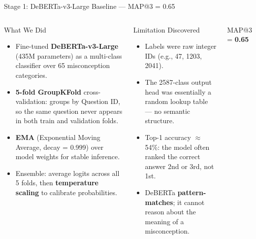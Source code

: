 ﻿\documentclass[aspectratio=169,10pt]{beamer}
\begin{document}
\begin{frame}{Stage 1: DeBERTa-v3-Large Baseline \texorpdfstring{--- MAP@3 = 0.65}{}}
\begin{columns}[T]
\begin{block}{What We Did}
\begin{itemize}
  \item Fine-tuned \textbf{DeBERTa-v3-Large} (435M parameters) as a multi-class classifier over 65 misconception categories.
  \item \textbf{5-fold GroupKFold} cross-validation: groups by Question ID, so the same question never appears in both train and validation folds.
  \item \textbf{EMA} (Exponential Moving Average, decay = 0.999) over model weights for stable inference.
  \item Ensemble: average logits across all 5 folds, then \textbf{temperature scaling} to calibrate probabilities.
\end{itemize}
\end{block}
\begin{alertblock}{Limitation Discovered}
\begin{itemize}
  \item Labels were raw integer IDs (e.g., 47, 1203, 2041).
  \item The 2587-class output head was essentially a random lookup table --- no semantic structure.
  \item Top-1 accuracy $\approx$ 54\%: the model often ranked the correct answer 2nd or 3rd, not 1st.
  \item DeBERTa \textbf{pattern-matches}; it cannot reason about the meaning of a misconception.
\end{itemize}
\end{alertblock}
\vspace{6pt}
\begin{center}
{\Large\color{TitleBlue} MAP@3 = \textbf{0.65}}
\end{center}
\end{columns}
\end{frame}
\end{document}
